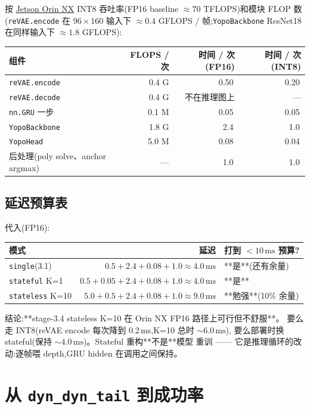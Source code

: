 \documentclass[UTF8, 11pt]{ctexart}
\newcommand{\ms}{\,\text{ms}}
\begin{document}
按
\href{https://developer.nvidia.com/embedded/jetson-orin}{Jetson Orin NX} INT8
吞吐率(FP16 baseline $\approx 70$ TFLOPS)和模块 FLOP 数(\texttt{reVAE.encode}
在 $96\times160$ 输入下 $\approx 0.4$ GFLOPS / 帧;\texttt{YopoBackbone}
ResNet18 在同样输入下 $\approx 1.8$ GFLOPS):
\begin{center}
\begin{tabular}{lrrr}
\hline
组件 & FLOPS / 次 & 时间 / 次 (FP16) & 时间 / 次 (INT8) \\
\hline
\texttt{reVAE.encode}     & 0.4 G & 0.50\ms & 0.20\ms \\
\texttt{reVAE.decode}     & 0.4 G & 不在推理图上 & --- \\
\texttt{nn.GRU} 一步      & 0.1 M & 0.05\ms & 0.05\ms \\
\texttt{YopoBackbone}     & 1.8 G & 2.4\ms  & 1.0\ms \\
\texttt{YopoHead}         & 5.0 M & 0.08\ms & 0.04\ms \\
后处理(poly solve、anchor argmax) & --- & 1.0\ms & 1.0\ms \\
\hline
\end{tabular}
\end{center}

\subsection{延迟预算表}

代入(FP16):
\begin{center}
\begin{tabular}{lrl}
\hline
模式                    & 延迟 & 打到 $<10\ms$ 预算? \\
\hline
\texttt{single}(3.1)   & $0.5 + 2.4 + 0.08 + 1.0 \approx 4.0\ms$  & **是**(还有余量) \\
\texttt{stateful} K=1   & $0.5 + 0.05 + 2.4 + 0.08 + 1.0 \approx 4.0\ms$ & **是** \\
\texttt{stateless} K=10 & $5.0 + 0.5 + 2.4 + 0.08 + 1.0 \approx 9.0\ms$  & **勉强**(10\% 余量) \\
\hline
\end{tabular}
\end{center}

结论:**stage-3.4 stateless K=10 在 Orin NX FP16 路径上可行但不舒服**。
要么走 INT8(reVAE encode 每次降到 0.2\,ms,K=10 总时 $\sim 6.0\ms$),
要么部署时换 stateful(保持 $\sim 4.0\ms$)。Stateful 重构**不是**模型
重训 —— 它是推理循环的改动:逐帧喂 depth,GRU hidden 在调用之间保持。

\section{从 \texttt{dyn\_dyn\_tail} 到成功率}
\end{document}

